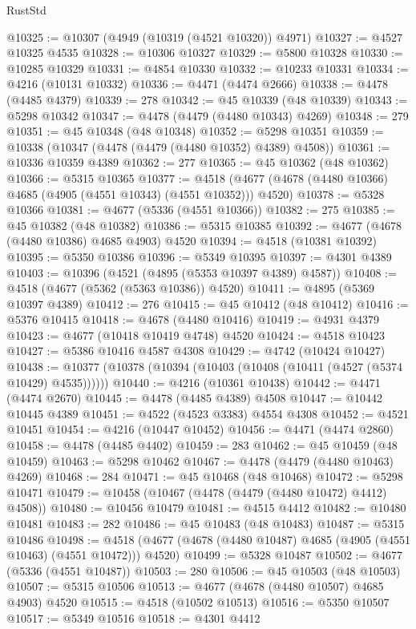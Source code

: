 \begin{lexlean}{RustStd}
\begin{coremodule}
@10325 := @10307 (@4949 (@10319 (@4521 @10320)) @4971)
@10327 := @4527 @10325 @4535
@10328 := @10306 @10327
@10329 := @5800 @10328
@10330 := @10285 @10329
@10331 := @4854 @10330
@10332 := @10233 @10331
@10334 := @4216 (@10131 @10332)
@10336 := @4471 (@4474 @2666)
@10338 := @4478 (@4485 @4379)
@10339 := 278
@10342 := @45 @10339 (@48 @10339)
@10343 := @5298 @10342
@10347 := @4478 (@4479 (@4480 @10343) @4269)
@10348 := 279
@10351 := @45 @10348 (@48 @10348)
@10352 := @5298 @10351
@10359 := @10338 (@10347 (@4478 (@4479 (@4480 @10352) @4389) @4508))
@10361 := @10336 @10359 @4389
@10362 := 277
@10365 := @45 @10362 (@48 @10362)
@10366 := @5315 @10365
@10377 := @4518 (@4677 (@4678 (@4480 @10366) @4685 (@4905 (@4551 @10343) (@4551 @10352))) @4520)
@10378 := @5328 @10366
@10381 := @4677 (@5336 (@4551 @10366))
@10382 := 275
@10385 := @45 @10382 (@48 @10382)
@10386 := @5315 @10385
@10392 := @4677 (@4678 (@4480 @10386) @4685 @4903) @4520
@10394 := @4518 (@10381 @10392)
@10395 := @5350 @10386
@10396 := @5349 @10395
@10397 := @4301 @4389
@10403 := @10396 (@4521 (@4895 (@5353 @10397 @4389) @4587))
@10408 := @4518 (@4677 (@5362 (@5363 @10386)) @4520)
@10411 := @4895 (@5369 @10397 @4389)
@10412 := 276
@10415 := @45 @10412 (@48 @10412)
@10416 := @5376 @10415
@10418 := @4678 (@4480 @10416)
@10419 := @4931 @4379
@10423 := @4677 (@10418 @10419 @4748) @4520
@10424 := @4518 @10423
@10427 := @5386 @10416 @4587 @4308
@10429 := @4742 (@10424 @10427)
@10438 := @10377 (@10378 (@10394 (@10403 (@10408 (@10411 (@4527 (@5374 @10429) @4535))))))
@10440 := @4216 (@10361 @10438)
@10442 := @4471 (@4474 @2670)
@10445 := @4478 (@4485 @4389) @4508
@10447 := @10442 @10445 @4389
@10451 := @4522 (@4523 @3383) @4554 @4308
@10452 := @4521 @10451
@10454 := @4216 (@10447 @10452)
@10456 := @4471 (@4474 @2860)
@10458 := @4478 (@4485 @4402)
@10459 := 283
@10462 := @45 @10459 (@48 @10459)
@10463 := @5298 @10462
@10467 := @4478 (@4479 (@4480 @10463) @4269)
@10468 := 284
@10471 := @45 @10468 (@48 @10468)
@10472 := @5298 @10471
@10479 := @10458 (@10467 (@4478 (@4479 (@4480 @10472) @4412) @4508))
@10480 := @10456 @10479
@10481 := @4515 @4412
@10482 := @10480 @10481
@10483 := 282
@10486 := @45 @10483 (@48 @10483)
@10487 := @5315 @10486
@10498 := @4518 (@4677 (@4678 (@4480 @10487) @4685 (@4905 (@4551 @10463) (@4551 @10472))) @4520)
@10499 := @5328 @10487
@10502 := @4677 (@5336 (@4551 @10487))
@10503 := 280
@10506 := @45 @10503 (@48 @10503)
@10507 := @5315 @10506
@10513 := @4677 (@4678 (@4480 @10507) @4685 @4903) @4520
@10515 := @4518 (@10502 @10513)
@10516 := @5350 @10507
@10517 := @5349 @10516
@10518 := @4301 @4412

\end{coremodule}
\end{lexlean}
